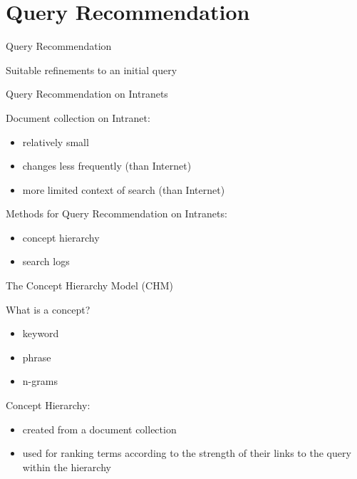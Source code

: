 \section{Query Recommendation}


\begin{frame}{Query Recommendation}

Suitable refinements to an initial query

\end{frame}


\begin{frame}{Query Recommendation on Intranets}

Document collection on Intranet:
\begin{itemize}
	\item relatively small
	\item changes less frequently (than Internet)
	\item more limited context of search (than Internet) \newline
\end{itemize}

Methods for Query Recommendation on Intranets:
\begin{itemize}
	\item concept hierarchy
	\item search logs
\end{itemize} 

\end{frame}


\begin{frame}{The Concept Hierarchy Model (CHM)}

What is a concept?
\begin{itemize}
	\item keyword
	\item phrase
	\item n-grams \newline
\end{itemize}

Concept Hierarchy:
\begin{itemize}
	\item created from a document collection
	\item used for ranking terms according to the strength of their links to the query within the hierarchy
\end{itemize}

\end{frame}


